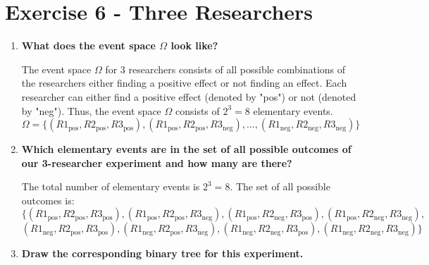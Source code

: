 \documentclass[a4paper, 12pt]{article}
\begin{document}
\section*{Exercise 6 - Three Researchers}

\begin{enumerate}
    \item \textbf{What does the event space $\Omega$ look like?}
    
    The event space $\Omega$ for 3 researchers consists of all possible combinations of the researchers either finding a positive effect or not finding an effect. Each researcher can either find a positive effect (denoted by "pos") or not (denoted by "neg"). Thus, the event space $\Omega$ consists of $2^3 = 8$ elementary events.
    \[
    \Omega = \{(R1_{\text{pos}}, R2_{\text{pos}}, R3_{\text{pos}}), (R1_{\text{pos}}, R2_{\text{pos}}, R3_{\text{neg}}), \dots, (R1_{\text{neg}}, R2_{\text{neg}}, R3_{\text{neg}})\}
    \]
  
    \item \textbf{Which elementary events are in the set of all possible outcomes of our 3-researcher experiment and how many are there?}
    
    The total number of elementary events is $2^3 = 8$. The set of all possible outcomes is:
    \[
    \{(R1_{\text{pos}}, R2_{\text{pos}}, R3_{\text{pos}}), (R1_{\text{pos}}, R2_{\text{pos}}, R3_{\text{neg}}), (R1_{\text{pos}}, R2_{\text{neg}}, R3_{\text{pos}}), (R1_{\text{pos}}, R2_{\text{neg}}, R3_{\text{neg}}),
    \]
    \[
    (R1_{\text{neg}}, R2_{\text{pos}}, R3_{\text{pos}}), (R1_{\text{neg}}, R2_{\text{pos}}, R3_{\text{neg}}), (R1_{\text{neg}}, R2_{\text{neg}}, R3_{\text{pos}}), (R1_{\text{neg}}, R2_{\text{neg}}, R3_{\text{neg}})\}
    \]
    
    \item \textbf{Draw the corresponding binary tree for this experiment.}
    

\begin{center}
\end{center}


\end{enumerate}
\end{document}

